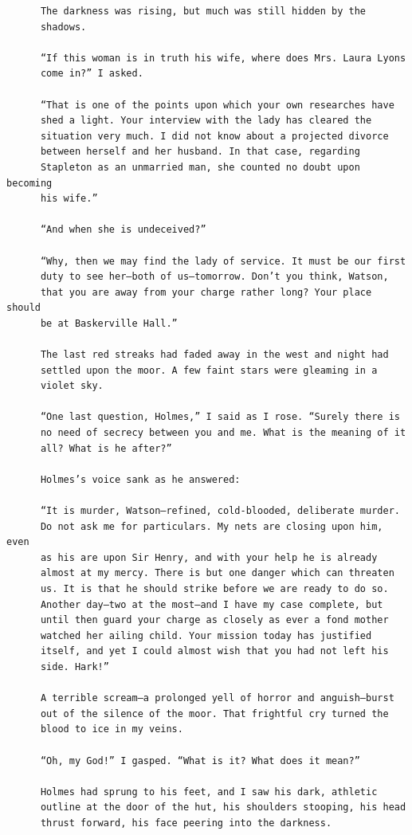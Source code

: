 \documentclass{article}
\begin{document}
\begin{verbatim}
      The darkness was rising, but much was still hidden by the
      shadows.

      “If this woman is in truth his wife, where does Mrs. Laura Lyons
      come in?” I asked.

      “That is one of the points upon which your own researches have
      shed a light. Your interview with the lady has cleared the
      situation very much. I did not know about a projected divorce
      between herself and her husband. In that case, regarding
      Stapleton as an unmarried man, she counted no doubt upon becoming
      his wife.”

      “And when she is undeceived?”

      “Why, then we may find the lady of service. It must be our first
      duty to see her—both of us—tomorrow. Don’t you think, Watson,
      that you are away from your charge rather long? Your place should
      be at Baskerville Hall.”

      The last red streaks had faded away in the west and night had
      settled upon the moor. A few faint stars were gleaming in a
      violet sky.

      “One last question, Holmes,” I said as I rose. “Surely there is
      no need of secrecy between you and me. What is the meaning of it
      all? What is he after?”

      Holmes’s voice sank as he answered:

      “It is murder, Watson—refined, cold-blooded, deliberate murder.
      Do not ask me for particulars. My nets are closing upon him, even
      as his are upon Sir Henry, and with your help he is already
      almost at my mercy. There is but one danger which can threaten
      us. It is that he should strike before we are ready to do so.
      Another day—two at the most—and I have my case complete, but
      until then guard your charge as closely as ever a fond mother
      watched her ailing child. Your mission today has justified
      itself, and yet I could almost wish that you had not left his
      side. Hark!”

      A terrible scream—a prolonged yell of horror and anguish—burst
      out of the silence of the moor. That frightful cry turned the
      blood to ice in my veins.

      “Oh, my God!” I gasped. “What is it? What does it mean?”

      Holmes had sprung to his feet, and I saw his dark, athletic
      outline at the door of the hut, his shoulders stooping, his head
      thrust forward, his face peering into the darkness.


\end{verbatim}
\end{document}
